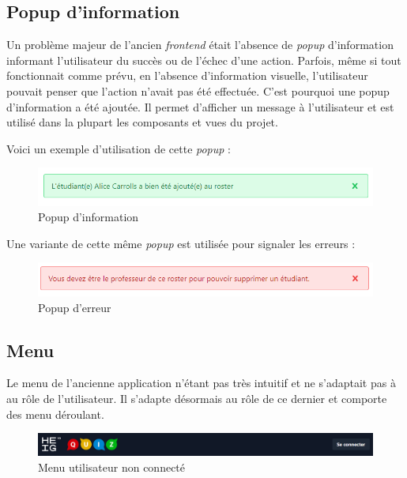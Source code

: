 \subsection{Popup d'information}
Un problème majeur de l'ancien \emph{frontend} était l'absence de \emph{popup} d'information informant l'utilisateur du succès ou de l'échec d'une action. Parfois, même si tout fonctionnait comme prévu, en l'absence d'information visuelle, l'utilisateur pouvait penser que l'action n'avait pas été effectuée.
C'est pourquoi une popup d'information a été ajoutée. Il permet d'afficher un message à l'utilisateur et est utilisé dans la plupart les composants et vues du projet.

Voici un exemple d'utilisation de cette \emph{popup} :
\begin{center}
    \begin{figure}[H]
        \includegraphics[width=\textwidth]{./assets/figures/validationPopup.png}
        \caption{Popup d'information}
    \end{figure}
\end{center}

Une variante de cette même \emph{popup} est utilisée pour signaler les erreurs :
\begin{center}
    \begin{figure}[H]
        \includegraphics[width=\textwidth]{./assets/figures/errorPopup.png}
        \caption{Popup d'erreur}
    \end{figure}
\end{center}

\subsection{Menu}
Le menu de l'ancienne application n'étant pas très intuitif et ne s'adaptait pas à au rôle de l'utilisateur. Il s'adapte désormais au rôle de ce dernier et comporte des menu déroulant.

\begin{center}
    \begin{figure}[H]
        \includegraphics[width=\textwidth]{./assets/figures/basicNav.png}
        \caption{Menu utilisateur non connecté}
    \end{figure}
\end{center}

